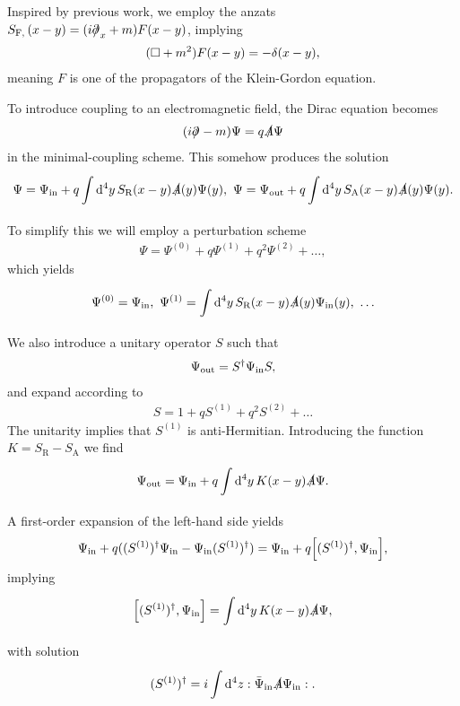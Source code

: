 Inspired by previous work, we employ the anzats $S_{\text{F}, }\left(x - y\right) = (i\slashed{\partial^{}_{}}_{x} + m)F(x - y)$, implying
\begin{align*}
	(\square  + m^{2})F(x - y) = -\delta(x - y),
\end{align*}
meaning $F$ is one of the propagators of the Klein-Gordon equation.

To introduce coupling to an electromagnetic field, the Dirac equation becomes
\begin{align*}
	(i\slashed{\partial^{}_{}} - m)\Psi = q\slashed{A}\Psi
\end{align*}
in the minimal-coupling scheme. This somehow produces the solution
\begin{align*}
	\Psi = \Psi_{\text{in}} + q\int\limits_{}^{}\dd[4]{y}S_{\text{R}}(x - y)\slashed{A}(y)\Psi(y),\ \Psi = \Psi_{\text{out}} + q\int\limits_{}^{}\dd[4]{y}S_{\text{A}}(x - y)\slashed{A}(y)\Psi(y).
\end{align*}
To simplify this we will employ a perturbation scheme
\begin{align*}
	\Psi = \Psi^{(0)} + q\Psi^{(1)} + q^{2}\Psi^{(2)} + \dots,
\end{align*}
which yields
\begin{align*}
	\Psi^{(0)} = \Psi_{\text{in}},\ \Psi^{(1)} = \integ[4]{}{}{y}{S_{\text{R}}(x - y)\fsl{A}(y)\Psi_{\text{in}}(y)},\ \dots
\end{align*}
We also introduce a unitary operator $S$ such that
\begin{align*}
	\Psi_{\text{out}} = S^{\dagger}\Psi_{\text{in}}S,
\end{align*}
and expand according to
\begin{align*}
	S = 1 + qS^{(1)} + q^{2}S^{(2)} + \dots
\end{align*}
The unitarity implies that $S^{(1)}$ is anti-Hermitian. Introducing the function $K = S_{\text{R}} - S_{\text{A}}$ we find
\begin{align*}
	\Psi_{\text{out}} = \Psi_{\text{in}} + q\int\limits_{}^{}\dd[4]{y}K(x - y)\slashed{A}\Psi.
\end{align*}
A first-order expansion of the left-hand side yields
\begin{align*}
	\Psi_{\text{in}} + q((S^{(1)})\adj\Psi_{\text{in}} - \Psi_{\text{in}}(S^{(1)})\adj) = \Psi_{\text{in}} + q\comm{(S^{(1)})\adj}{\Psi_{\text{in}}},
\end{align*}
implying
\begin{align*}
	\comm{(S^{(1)})\adj}{\Psi_{\text{in}}} = \integ[4]{}{}{y}{K(x - y)\fsl{A}\Psi},
\end{align*}
with solution
\begin{align*}
	(S^{(1)})^{\dagger} = i\int\limits_{}^{}\dd[4]{z}:\bar{\Psi}_{\text{in}}\slashed{A}\Psi_{\text{in}}:.
\end{align*}

